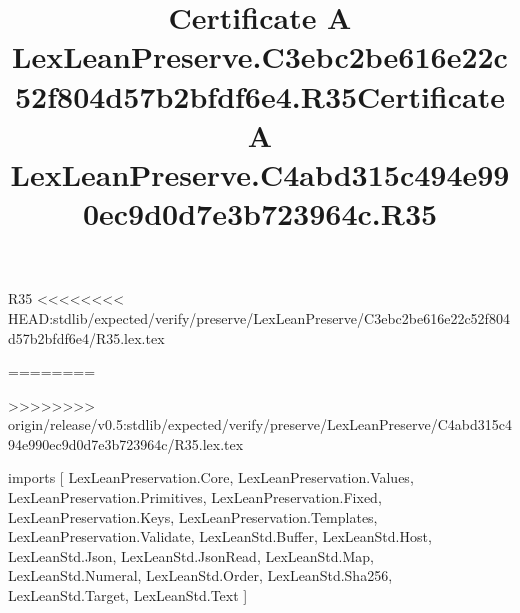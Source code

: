 \begin{lexlean}{R35}
<<<<<<<< HEAD:stdlib/expected/verify/preserve/LexLeanPreserve/C3ebc2be616e22c52f804d57b2bfdf6e4/R35.lex.tex
\title{Certificate A LexLeanPreserve.C3ebc2be616e22c52f804d57b2bfdf6e4.R35}
========
\title{Certificate A LexLeanPreserve.C4abd315c494e990ec9d0d7e3b723964c.R35}
>>>>>>>> origin/release/v0.5:stdlib/expected/verify/preserve/LexLeanPreserve/C4abd315c494e990ec9d0d7e3b723964c/R35.lex.tex
\begin{coremodule}
imports [
  LexLeanPreservation.Core,
  LexLeanPreservation.Values,
  LexLeanPreservation.Primitives,
  LexLeanPreservation.Fixed,
  LexLeanPreservation.Keys,
  LexLeanPreservation.Templates,
  LexLeanPreservation.Validate,
  LexLeanStd.Buffer,
  LexLeanStd.Host,
  LexLeanStd.Json,
  LexLeanStd.JsonRead,
  LexLeanStd.Map,
  LexLeanStd.Numeral,
  LexLeanStd.Order,
  LexLeanStd.Sha256,
  LexLeanStd.Target,
  LexLeanStd.Text
]


\end{coremodule}
\end{lexlean}
